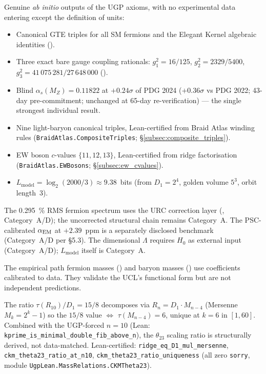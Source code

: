 \documentclass[11pt]{article}
\theoremstyle{remark}
\begin{document}
\begin{description}[leftmargin=1.2em,labelindent=0em,itemsep=0.3em]
\item[Category A: First-principles derived quantities.]
Genuine \emph{ab initio} outputs of the UGP axioms, with no experimental data entering except the definition of units:
\begin{itemize}[leftmargin=1.5em,itemsep=0.1em,topsep=0.2em]
  \item Canonical GTE triples for all SM fermions and the Elegant Kernel algebraic identities ().
  \item Three exact bare gauge coupling rationals: $g_1^2 = 16/125$, $g_2^2 = 2329/5400$, $g_3^2 = 41\,075\,281/27\,648\,000$ ().
  \item Blind $\alpha_s(M_Z) = 0.11822$ at $+0.24\sigma$ of PDG 2024 ($+0.36\sigma$ vs PDG 2022; 43-day pre-commitment; unchanged at 65-day re-verification) --- the single strongest individual result.
  \item Nine light-baryon canonical triples, Lean-certified from Braid Atlas winding rules (\texttt{BraidAtlas.CompositeTriples}; \S\ref{subsec:composite_triples}).
  \item EW boson $c$-values $\{11,12,13\}$, Lean-certified from ridge factorisation (\texttt{BraidAtlas.EWBosons}; \S\ref{subsec:ew_cvalues}).
  \item $L_{\mathrm{model}} = \log_2(2000/3) \approx 9.38$~bits (from $D_1 = 2^4$, golden volume $5^3$, orbit length~3).
\end{itemize}
The \SI{0.295}{\percent} RMS fermion spectrum uses the URC correction layer (, Category~A/D); the uncorrected structural chain remains Category~A.
The PSC-calibrated $\alpha_{\rm EM}$ at $+2.39$~ppm is a separately disclosed benchmark (Category~A/D per \S5.3).
The dimensional $\Lambda$ requires $H_0$ as external input (Category~A/D); $L_{\mathrm{model}}$ itself is Category~A.

\item[Category B: Calibrated benchmarks.]
The empirical path fermion masses () and baryon masses () use coefficients calibrated to data.
They validate the UCL's functional form but are not independent predictions.

\item[Category A: CKM $\theta_{23}$ structural ratio.]
\begin{sloppypar}
The ratio $\tau(R_{10})/D_1 = 15/8$ decomposes via $R_n = D_1 \cdot M_{n-4}$ (Mersenne $M_k = 2^k - 1$) so the $15/8$ value $\Leftrightarrow$ $\tau(M_{n-4}) = 6$, unique at $k = 6$ in $[1,60]$.  Combined with the UGP-forced $n = 10$ (Lean: \texttt{kprime\_is\_minimal\_double\_fib\_above\_n}), the $\theta_{23}$ scaling ratio is structurally derived, not data-matched.  Lean-certified: \texttt{ridge\_eq\_D1\_mul\_mersenne}, \texttt{ckm\_theta23\_ratio\_at\_n10}, \texttt{ckm\_theta23\_ratio\_uniqueness} (all zero \texttt{sorry}, module \texttt{UgpLean.MassRelations.\allowbreak CKMTheta23}).
\end{sloppypar}


\end{description}
\end{document}
